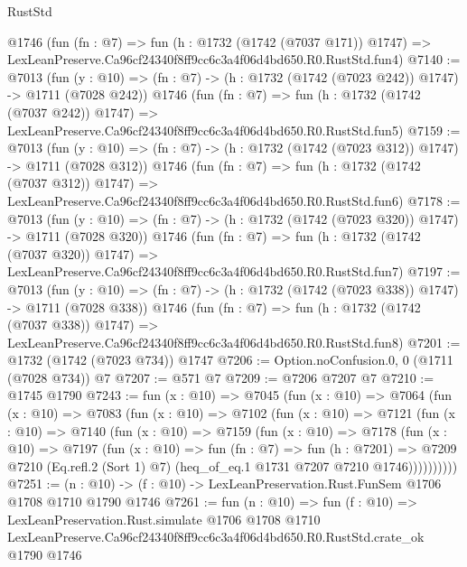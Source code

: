 \begin{lexlean}{RustStd}
\begin{coremodule}
    @1746
    (fun (fn : @7) =>
    fun (h : @1732 (@1742 (@7037 @171)) @1747) =>
    LexLeanPreserve.Ca96cf24340f8ff9cc6c3a4f06d4bd650.R0.RustStd.fun4)
@7140 := @7013
    (fun (y : @10) => (fn : @7) -> (h : @1732 (@1742 (@7023 @242)) @1747) -> @1711 (@7028 @242))
    @1746
    (fun (fn : @7) =>
    fun (h : @1732 (@1742 (@7037 @242)) @1747) =>
    LexLeanPreserve.Ca96cf24340f8ff9cc6c3a4f06d4bd650.R0.RustStd.fun5)
@7159 := @7013
    (fun (y : @10) => (fn : @7) -> (h : @1732 (@1742 (@7023 @312)) @1747) -> @1711 (@7028 @312))
    @1746
    (fun (fn : @7) =>
    fun (h : @1732 (@1742 (@7037 @312)) @1747) =>
    LexLeanPreserve.Ca96cf24340f8ff9cc6c3a4f06d4bd650.R0.RustStd.fun6)
@7178 := @7013
    (fun (y : @10) => (fn : @7) -> (h : @1732 (@1742 (@7023 @320)) @1747) -> @1711 (@7028 @320))
    @1746
    (fun (fn : @7) =>
    fun (h : @1732 (@1742 (@7037 @320)) @1747) =>
    LexLeanPreserve.Ca96cf24340f8ff9cc6c3a4f06d4bd650.R0.RustStd.fun7)
@7197 := @7013
    (fun (y : @10) => (fn : @7) -> (h : @1732 (@1742 (@7023 @338)) @1747) -> @1711 (@7028 @338))
    @1746
    (fun (fn : @7) =>
    fun (h : @1732 (@1742 (@7037 @338)) @1747) =>
    LexLeanPreserve.Ca96cf24340f8ff9cc6c3a4f06d4bd650.R0.RustStd.fun8)
@7201 := @1732 (@1742 (@7023 @734)) @1747
@7206 := Option.noConfusion.{0, 0} (@1711 (@7028 @734)) @7
@7207 := @571 @7
@7209 := @7206 @7207 @7
@7210 := @1745 @1790
@7243 := fun (x : @10) =>
  @7045
    (fun (x : @10) =>
    @7064
      (fun (x : @10) =>
      @7083
        (fun (x : @10) =>
        @7102
          (fun (x : @10) =>
          @7121
            (fun (x : @10) =>
            @7140
              (fun (x : @10) =>
              @7159
                (fun (x : @10) =>
                @7178
                  (fun (x : @10) =>
                  @7197
                    (fun (x : @10) =>
                    fun (fn : @7) =>
                    fun (h : @7201) =>
                    @7209
                      @7210
                      (Eq.refl.{2} (Sort 1) @7)
                      (heq_of_eq.{1} @1731 @7207 @7210 @1746))))))))))
@7251 := (n : @10) -> (f : @10) -> LexLeanPreservation.Rust.FunSem @1706 @1708 @1710 @1790 @1746
@7261 := fun (n : @10) =>
  fun (f : @10) =>
  LexLeanPreservation.Rust.simulate
    @1706
    @1708
    @1710
    LexLeanPreserve.Ca96cf24340f8ff9cc6c3a4f06d4bd650.R0.RustStd.crate_ok
    @1790
    @1746
\end{coremodule}
\end{lexlean}
